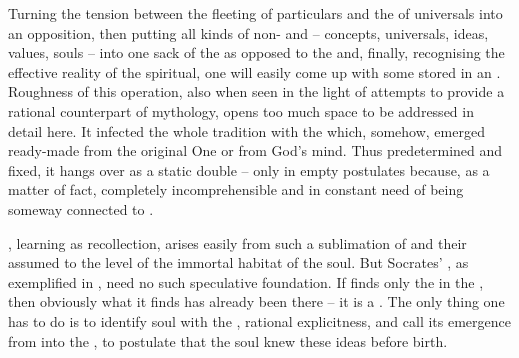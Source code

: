 \label{anamnesis}
%
Turning the tension between the fleeting  of particulars and the
 of universals into an opposition, then putting all kinds of
non- and  -- concepts, universals, ideas,
values, souls -- into one sack of the  as opposed to the
 and, finally, recognising the effective reality of the spiritual,
one will easily come up with some  stored in an
. Roughness of this operation, also when seen in
the light of attempts to provide a rational counterpart of mythology, opens too
much space to be addressed in detail here. It infected the whole tradition with
the  which, somehow, emerged ready-made from
the {original One} or from God's mind. Thus predetermined and fixed, it hangs over  as a static double --  only in empty postulates
because, as a matter of fact, completely incomprehensible and in constant need
of being someway connected to .

, learning as recollection, arises easily from such a sublimation
of  and their assumed  to the level of the immortal
habitat of the soul. But Socrates' , as
exemplified in , need no such speculative foundation.  If
 finds only the  in the , then
obviously what it finds has already been there -- it is a .  The
only thing one has to do is to identify soul with the ,
rational explicitness, and call its emergence from  into the
 , to postulate that the soul knew these ideas before
birth.

